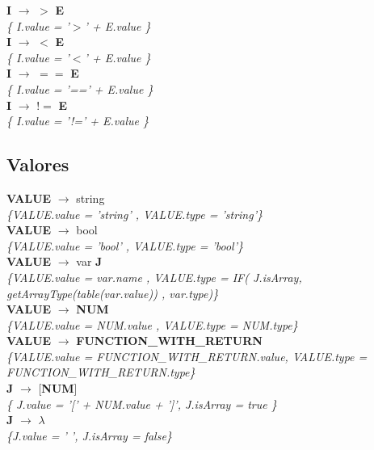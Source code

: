 \documentclass[10pt,a4paper]{article}
\begin{document}
\textbf{I} $\rightarrow$ $>$ \textbf{E} \\
\textit{\{ I.value = '$>$' + E.value  \}} \\

\textbf{I} $\rightarrow$ $<$ \textbf{E}\\
\textit{\{ I.value = '$<$' + E.value  \}} \\

\textbf{I} $\rightarrow$ $==$ \textbf{E}\\
\textit{\{ I.value =  '==' + E.value  \}} \\

\textbf{I} $\rightarrow$ $!=$ \textbf{E}\\
\textit{\{ I.value =  '!=' + E.value  \}} \\

\subsection{Valores}
\textbf{VALUE} $\rightarrow$ string \\
\textit{\{VALUE.value =  'string' , VALUE.type = 'string'\}} \\


\textbf{VALUE} $\rightarrow$ bool   \\
\textit{\{VALUE.value =  'bool' , VALUE.type = 'bool'\}} \\


\textbf{VALUE} $\rightarrow$ var \textbf{J} \\
\textit{\{VALUE.value =  var.name , VALUE.type = IF( J.isArray, getArrayType(table(var.value)) , var.type)\}} \\


\textbf{VALUE} $\rightarrow$ \textbf{NUM}   \\
\textit{\{VALUE.value =  NUM.value , VALUE.type =  NUM.type\}} \\


\textbf{VALUE} $\rightarrow$ \textbf{FUNCTION\_WITH\_RETURN} \\
\textit{\{VALUE.value =  FUNCTION\_WITH\_RETURN.value, VALUE.type = FUNCTION\_WITH\_RETURN.type\}} \\

\textbf{J} $\rightarrow$ [\textbf{NUM}] \\
\textit{\{ J.value = '[' + NUM.value + ']', J.isArray = true   \}} \\

\textbf{J} $\rightarrow$ $\lambda$   \\
\textit{\{J.value = ' ', J.isArray = false\}} \\
\end{document}
